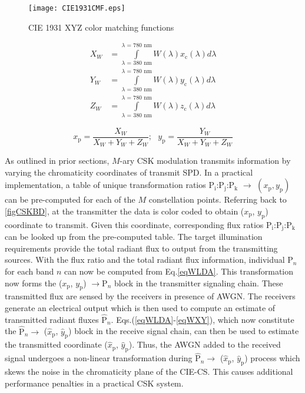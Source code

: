 \begin{figure}[!t]
	\centering
		\texttt{[image: CIE1931CMF.eps]}
	\caption{CIE 1931 XYZ color matching functions}
	\label{figCIEXYZ}
\end{figure}

\begin{equation}
	\begin{aligned}
		X_{W} &= \int\limits_{\lambda\text{ = 380 nm}}^{\lambda\text{ = 780 nm}}W(\lambda)x_{\text{c}}(\lambda)d\lambda\\
		Y_{W} &= \int\limits_{\lambda\text{ = 380 nm}}^{\lambda\text{ = 780 nm}}W(\lambda)y_{\text{c}}(\lambda)d\lambda\\
		Z_{W} &= \int\limits_{\lambda\text{ = 380 nm}}^{\lambda\text{ = 780 nm}}W(\lambda)z_{\text{c}}(\lambda)d\lambda
	\end{aligned}
	\label{eqTXYZ}
\end{equation}

\begin{equation}
	x_{\text{p}} = \frac{X_{W}}{X_{W}+Y_{W}+Z_{W}}; \text{  } y_{\text{p}} = \frac{Y_{W}}{X_{W}+Y_{W}+Z_{W}} %
	\label{eqWXY}
\end{equation}

As outlined in prior sections, $M$-ary CSK modulation transmits information by varying the chromaticity coordinates of transmit SPD. In a practical implementation, a table of unique transformation ratios P$_{\text{i}}$:P$_{\text{j}}$:P$_{\text{k}}$ $\rightarrow$ $(x_{\text{p}},y_{\text{p}})$ can be pre-computed for each of the $M$ constellation points. Referring back to \figurename{ }\ref{figCSKBD}, at the transmitter the data is color coded to obtain ($x_{\text{p}}$, $y_{\text{p}}$) coordinate to transmit. Given this coordinate, corresponding flux ratios P$_{\text{i}}$:P$_{\text{j}}$:P$_{\text{k}}$ can be looked up from the pre-computed table. The target illumination requirements provide the total radiant flux to output from the transmitting sources. With the flux ratio and the total radiant flux information, individual P$_{n}$ for each band $n$ can now be computed from Eq.\eqref{eqWLDA}. This transformation now forms the ($x_{\text{p}}$, $y_{\text{p}}$) $\rightarrow  \text{P}_{n}$ block in the transmitter signaling chain. These transmitted flux are sensed by the receivers in presence of AWGN. The receivers generate an electrical output which is then used to compute an estimate of transmitted radiant fluxes $\hat{\text{P}}_{n}$. Eqs.(\ref{eqWLDA}-\ref{eqWXY}), which now constitute the $\hat{\text{P}}_{n}\rightarrow$ ($\hat{x}_{\text{p}}$, $\hat{y}_{\text{p}}$) block in the receive signal chain, can then be used to estimate the transmitted coordinate ($\hat{x}_{\text{p}}$, $\hat{y}_{\text{p}}$). Thus, the AWGN added to the received signal undergoes a non-linear transformation during $\hat{\text{P}}_{n}\rightarrow$ ($\hat{x}_{\text{p}}$, $\hat{y}_{\text{p}}$) process which skews the noise in the chromaticity plane of the CIE-CS. This causes additional performance penalties in a practical CSK system.

